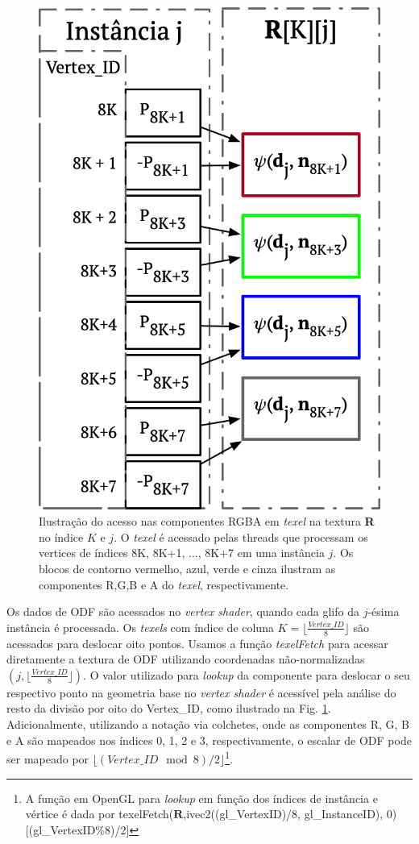 \begin{figure}[ht]
    \centering
    \includegraphics[width=.45\linewidth, angle=0]{figs/Esquema_Glifo/texellookup.png}
    \caption{Ilustração do acesso nas componentes RGBA em \textit{texel} na textura \textbf{R} no índice $K$ e $j$. O \textit{texel} é acessado pelas threads que processam os vertices de índices 8K, 8K+1, ..., 8K+7 em uma instância $j$. Os blocos de contorno vermelho, azul, verde e cinza ilustram as componentes R,G,B e A do \textit{texel}, respectivamente.}
    \label{fig::texelfetch}
\end{figure}

Os dados de ODF são acessados no \textit{vertex shader}, quando cada glifo da $j$-ésima instância é processada. Os \textit{texels} com índice de coluna $K = \lfloor\frac{Vertex\_ID}{8} \rfloor$ são acessados para deslocar oito pontos. Usamos a função \textit{texelFetch} para acessar diretamente a textura de ODF utilizando coordenadas não-normalizadas $(j, \lfloor\frac{Vertex\_ID}{8} \rfloor)$. O valor utilizado para \textit{lookup} da componente  para deslocar o seu respectivo ponto na geometria base no \textit{vertex shader} é acessível pela análise do resto da divisão por oito do Vertex\_ID, como ilustrado na Fig. \ref{fig::texelfetch}. Adicionalmente, utilizando a notação via colchetes, onde as componentes R, G, B e A são mapeados nos índices 0, 1, 2 e 3, respectivamente, o escalar de ODF pode ser mapeado por $\lfloor (Vertex\_ID \mod{8})/2 \rfloor$\footnote{A função em OpenGL para \textit{lookup} em função dos índices de instância e vértice é dada por texelFetch($\mathbf{R}$,ivec2((gl\_VertexID)/8, gl\_InstanceID), 0)[(gl\_VertexID\%8)/2]}.

